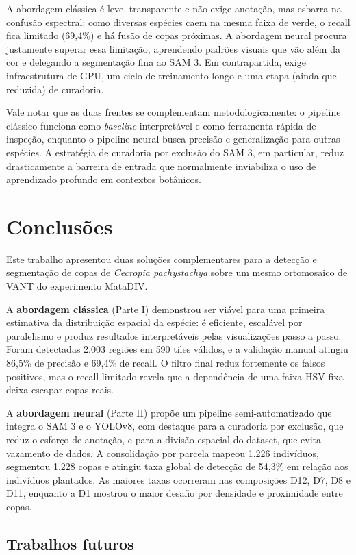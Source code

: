 \documentclass[12pt, a4paper]{article}
\begin{document}
A abordagem clássica é leve, transparente e não exige anotação, mas esbarra na
confusão espectral: como diversas espécies caem na mesma faixa de verde, o recall
fica limitado (69,4\%) e há fusão de copas próximas. A abordagem neural procura
justamente superar essa limitação, aprendendo padrões visuais que vão além da cor e
delegando a segmentação fina ao SAM 3. Em contrapartida, exige infraestrutura de
GPU, um ciclo de treinamento longo e uma etapa (ainda que reduzida) de curadoria.

Vale notar que as duas frentes se complementam metodologicamente: o pipeline
clássico funciona como \textit{baseline} interpretável e como ferramenta rápida de
inspeção, enquanto o pipeline neural busca precisão e generalização para outras
espécies. A estratégia de curadoria por exclusão do SAM 3, em particular, reduz
drasticamente a barreira de entrada que normalmente inviabiliza o uso de
aprendizado profundo em contextos botânicos.

\section{Conclusões}

Este trabalho apresentou duas soluções complementares para a detecção e segmentação
de copas de \textit{Cecropia pachystachya} sobre um mesmo ortomosaico de VANT do
experimento MataDIV.

A \textbf{abordagem clássica} (Parte I) demonstrou ser viável para uma primeira
estimativa da distribuição espacial da espécie: é eficiente, escalável por
paralelismo e produz resultados interpretáveis pelas visualizações passo a passo.
Foram detectadas 2.003 regiões em 590 tiles válidos, e a validação manual atingiu
86,5\% de precisão e 69,4\% de recall. O filtro final reduz fortemente os falsos
positivos, mas o recall limitado revela que a dependência de uma faixa HSV fixa
deixa escapar copas reais.

A \textbf{abordagem neural} (Parte II) propõe um pipeline semi-automatizado que
integra o SAM 3 e o YOLOv8, com destaque para a curadoria por exclusão, que reduz o
esforço de anotação, e para a divisão espacial do dataset, que evita vazamento de
dados. A consolidação por parcela mapeou 1.226 indivíduos, segmentou 1.228 copas e
atingiu taxa global de detecção de 54,3\% em relação aos indivíduos plantados. As
maiores taxas ocorreram nas composições D12, D7, D8 e D11, enquanto a D1 mostrou o
maior desafio por densidade e proximidade entre copas.

\subsection*{Trabalhos futuros}
\end{document}
